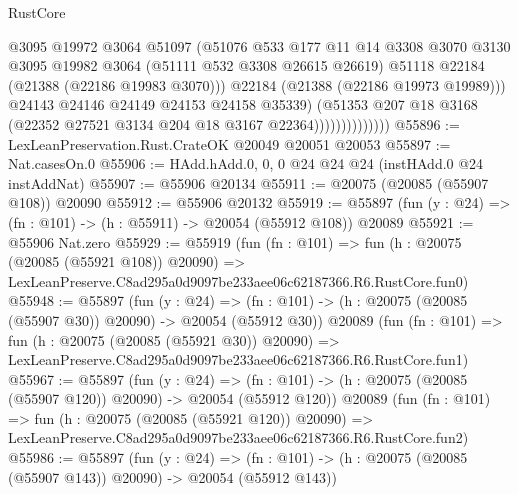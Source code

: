 \begin{lexlean}{RustCore}
\begin{coremodule}
                                @3095
                                @19972
                                @3064
                                @51097
                                (@51076
                                  @533
                                  @177
                                  @11
                                  @14
                                  @3308
                                  @3070
                                  @3130
                                  @3095
                                  @19982
                                  @3064
                                  (@51111 @532 @3308 @26615 @26619)
                                  @51118
                                  @22184
                                  (@21388 (@22186 @19983 @3070)))
                                @22184
                                (@21388 (@22186 @19973 @19989)))
                              @24143
                              @24146
                              @24149
                              @24153
                              @24158
                              @35339)
                            (@51353
                              @207
                              @18
                              @3168
                              (@22352 @27521 @3134 @204 @18 @3167 @22364))))))))))))))
@55896 := LexLeanPreservation.Rust.CrateOK @20049 @20051 @20053
@55897 := Nat.casesOn.{0}
@55906 := HAdd.hAdd.{0, 0, 0} @24 @24 @24 (instHAdd.{0} @24 instAddNat)
@55907 := @55906 @20134
@55911 := @20075 (@20085 (@55907 @108)) @20090
@55912 := @55906 @20132
@55919 := @55897 (fun (y : @24) => (fn : @101) -> (h : @55911) -> @20054 (@55912 @108)) @20089
@55921 := @55906 Nat.zero
@55929 := @55919
    (fun (fn : @101) =>
    fun (h : @20075 (@20085 (@55921 @108)) @20090) =>
    LexLeanPreserve.C8ad295a0d9097be233aee06c62187366.R6.RustCore.fun0)
@55948 := @55897
    (fun (y : @24) =>
    (fn : @101) -> (h : @20075 (@20085 (@55907 @30)) @20090) -> @20054 (@55912 @30))
    @20089
    (fun (fn : @101) =>
    fun (h : @20075 (@20085 (@55921 @30)) @20090) =>
    LexLeanPreserve.C8ad295a0d9097be233aee06c62187366.R6.RustCore.fun1)
@55967 := @55897
    (fun (y : @24) =>
    (fn : @101) -> (h : @20075 (@20085 (@55907 @120)) @20090) -> @20054 (@55912 @120))
    @20089
    (fun (fn : @101) =>
    fun (h : @20075 (@20085 (@55921 @120)) @20090) =>
    LexLeanPreserve.C8ad295a0d9097be233aee06c62187366.R6.RustCore.fun2)
@55986 := @55897
    (fun (y : @24) =>
    (fn : @101) -> (h : @20075 (@20085 (@55907 @143)) @20090) -> @20054 (@55912 @143))

\end{coremodule}
\end{lexlean}
